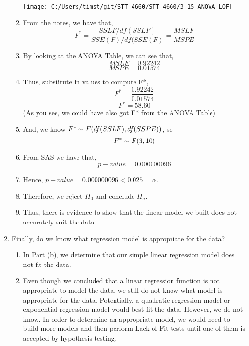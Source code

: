 \documentclass{article}
\begin{document}
\begin{enumerate}[label = \alph*)]
\begin{enumerate}[label = \arabic*)]
			\texttt{[image: C:/Users/timst/git/STT-4660/STT 4660/3\_15\_ANOVA\_LOF]}
			\item From the notes, we have that,
			\[F^* = \frac{SSLF/df(SSLF)}{SSE(F)/df(SSE(F)} = \frac{MSLF}{MSPE}\]
			\item By looking at the ANOVA Table, we can see that,
			\[MSLF = 0.92242\]
			\[MSPE = 0.01574\]
			\item Thus, substitute in values to compute F*,
			\[F^* = \frac{0.92242}{0.01574}\]
			\[F^* = 58.60\]
			(As you see, we could have also got F* from the ANOVA Table)
			\item And, we know $F^* \thicksim F(df(SSLF),df(SSPE))$, so
			\[F^* \thicksim F(3,10)\]
			\item From SAS we have that,
			\[p-value = 0.000000096\]
			\item Hence, $p-value = 0.000000096 < 0.025 = \alpha$.
			\item Therefore, we reject $H_0$ and conclude $H_a$.
			\item Thus, there is evidence to show that the linear model we built does not
			accurately suit the data.
		\end{enumerate}
		\item Finally, do we know what regression model is appropriate for the data?
		\begin{enumerate}[label = \arabic*)]
			\item In Part (b), we determine that our simple linear regression model does not fit the data.
			\item Even though we concluded that a linear regression function is not appropriate to model the data, we still do not know what model is appropriate for the data. Potentially, a quadratic regression model or exponential regression model would best fit the data. However, we do not know. In order to determine an appropriate model, we would need to build more models and then perform Lack of Fit tests until one of them is accepted by hypothesis testing.
		\end{enumerate}
	\end{enumerate}
\end{document}

